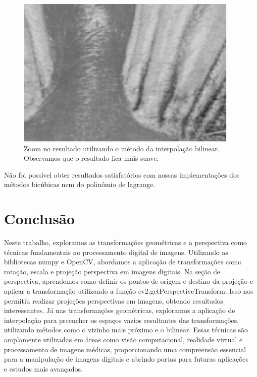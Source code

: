 \documentclass[11pt]{article}
\begin{document}
\begin{figure}[htbp]
\centering
\includegraphics[width=.9\linewidth]{./out/bilinear.png}
\caption{Zoom no resultado utilizando o método da interpolação bilinear. Observamos que o resultado fica mais suave.}
\end{figure}

Não foi possível obter resultados satisfatórios com nossas implementações dos métodos bicúbicas nem do polinômio de lagrange.

\section*{Conclusão}
\label{sec:org309ee0b}
Neste trabalho, exploramos as transformações geométricas e a perspectiva como técnicas fundamentais no processamento digital de imagens. Utilizando as bibliotecas numpy e OpenCV, abordamos a aplicação de transformações como rotação, escala e projeção perspectiva em imagens digitais. Na seção de perspectiva, aprendemos como definir os pontos de origem e destino da projeção e aplicar a transformação utilizando a função cv2.getPerspectiveTransform. Isso nos permitiu realizar projeções perspectivas em imagens, obtendo resultados interessantes. Já nas transformações geométricas, exploramos a aplicação de interpolação para preencher os espaços vazios resultantes das transformações, utilizando métodos como o vizinho mais próximo e o bilinear. Essas técnicas são amplamente utilizadas em áreas como visão computacional, realidade virtual e processamento de imagens médicas, proporcionando uma compreensão essencial para a manipulação de imagens digitais e abrindo portas para futuras aplicações e estudos mais avançados.
\end{document}
